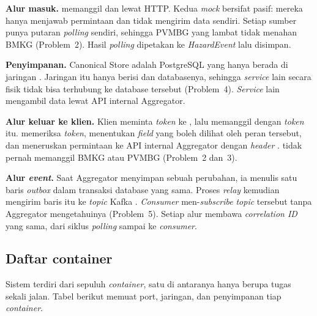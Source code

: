 \textbf{Alur masuk.}  memanggil  dan  lewat HTTP. Kedua \emph{mock} bersifat pasif:
mereka hanya menjawab permintaan dan tidak mengirim data sendiri. Setiap sumber punya putaran \emph{polling} sendiri, sehingga
PVMBG yang lambat tidak menahan BMKG (Problem~2). Hasil \emph{polling} dipetakan ke \emph{HazardEvent} lalu disimpan.

\textbf{Penyimpanan.} Canonical Store adalah PostgreSQL yang hanya berada di jaringan . Jaringan itu
hanya berisi  dan databasenya, sehingga \emph{service} lain secara fisik tidak bisa terhubung ke database
tersebut (Problem~4). \emph{Service} lain mengambil data lewat API internal Aggregator.

\textbf{Alur keluar ke klien.} Klien meminta \emph{token} ke , lalu memanggil  dengan \emph{token}
itu.  memeriksa \emph{token}, menentukan \emph{field} yang boleh dilihat oleh peran tersebut, dan meneruskan permintaan
ke API internal Aggregator dengan \emph{header} .  tidak pernah memanggil BMKG atau PVMBG
(Problem~2 dan~3).

\textbf{Alur \emph{event}.} Saat Aggregator menyimpan sebuah perubahan, ia menulis satu baris \emph{outbox} dalam transaksi
database yang sama. Proses \emph{relay} kemudian mengirim baris itu ke \emph{topic} Kafka . \emph{Consumer}
men-\emph{subscribe} \emph{topic} tersebut tanpa Aggregator mengetahuinya (Problem~5). Setiap alur membawa \emph{correlation ID} yang
sama, dari siklus \emph{polling} sampai ke \emph{consumer}.

\subsection*{Daftar container}

Sistem terdiri dari sepuluh \emph{container}, satu di antaranya hanya berupa tugas sekali jalan. Tabel berikut memuat port,
jaringan, dan penyimpanan tiap \emph{container}.

